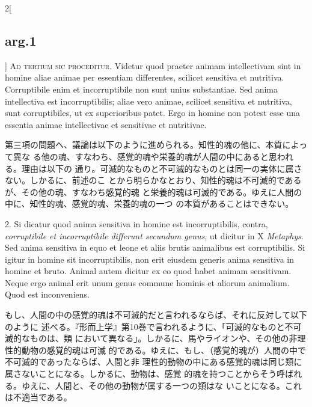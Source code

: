 \documentclass[paper=a4paper,fontsize=10pt,jafontsize=9pt,titlepage]{jlreq}
\begin{document}
\begin{paracol}{2}[\subsection{arg.1}]
{\scshape Ad tertium sic proceditur}. Videtur quod praeter animam intellectivam
sint in homine aliae animae per essentiam differentes, scilicet sensitiva et
nutritiva. Corruptibile enim et incorruptibile non sunt unius substantiae. Sed
anima intellectiva est incorruptibilis; aliae vero animae, scilicet sensitiva et
nutritiva, sunt corruptibiles, ut ex superioribus patet. Ergo in homine non
potest esse una essentia animae intellectivae et sensitivae et nutritivae.

\switchcolumn

 第三項の問題へ、議論は以下のように進められる。知性的魂の他に、本質によって異な
 る他の魂、すなわち、感覚的魂や栄養的魂が人間の中にあると思われる。理由は以下の
 通り。可滅的なものと不可滅的なものとは同一の実体に属さない。しかるに、前述のこ
 とから明らかなとおり、知性的魂は不可滅的であるが、その他の魂、すなわち感覚的魂
 と栄養的魂は可滅的である。ゆえに人間の中に、知性的魂、感覚的魂、栄養的魂の一つ
 の本質があることはできない。
 

2. Si dicatur quod anima sensitiva in homine est incorruptibilis, contra,
{\itshape corruptibile et incorruptibile differunt secundum genus}, ut dicitur
in X {\itshape Metaphys}. Sed anima sensitiva in equo et leone et aliis brutis
animalibus est corruptibilis. Si igitur in homine sit incorruptibilis, non erit
eiusdem generis anima sensitiva in homine et bruto. Animal autem dicitur ex eo
quod habet animam sensitivam. Neque ergo animal erit unum genus commune hominis
et aliorum animalium. Quod est inconveniens.

\switchcolumn

もし、人間の中の感覚的魂は不可滅的だと言われるならば、それに反対して以下のように
述べる。『形而上学』第10巻で言われるように、「可滅的なものと不可滅的なものは、類
において異なる」。しかるに、馬やライオンや、その他の非理性的動物の感覚的魂は可滅
的である。ゆえに、もし、（感覚的魂が）人間の中で不可滅的であったならば、人間と非
理性的動物の中にある感覚的魂は同じ類に属さないことになる。しかるに、動物は、感覚
的魂を持つことからそう呼ばれる。ゆえに、人間と、その他の動物が属する一つの類はな
いことになる。これは不適当である。
 

\end{paracol}
\end{document}
